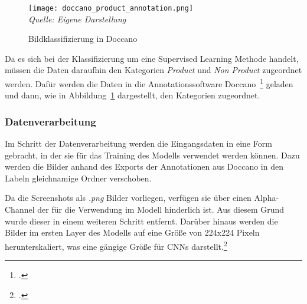 \begin{figure}[H]
    \centering
    \caption[]{Bildklassifizierung in Doccano}
	\label{fig:doccano_products}
    \texttt{[image: doccano\_product\_annotation.png]}
	\\
	\textit{Quelle: Eigene Darstellung}
\end{figure}
Da es sich bei der Klassifizierung um eine Supervised Learning Methode handelt, müssen die Daten daraufhin den Kategorien \textit{Product} und \textit{Non Product} zugeordnet werden.
Dafür werden die Daten in die Annotationssoftware Doccano~\footcite[\vglf][]{doccano-2018} geladen und dann, wie in Abbildung~\ref{fig:doccano_products} dargestellt, den Kategorien zugeordnet.

\subsubsection{Datenverarbeitung}\label{subsubsec_class_datenverarbeitung}
Im Schritt der Datenverarbeitung werden die Eingangsdaten in eine Form gebracht, in der sie für das Training des Modells verwendet werden können.
Dazu werden die Bilder anhand des Exports der Annotationen aus Doccano in den Labeln gleichnamige Ordner verschoben.

Da die Screenshots als \textit{.png} Bilder vorliegen, verfügen sie über einen Alpha-Channel der für die Verwendung im Modell hinderlich ist.
Aus diesem Grund wurde dieser in einem weiteren Schritt entfernt.
Darüber hinaus werden die Bilder im ersten Layer des Modells auf eine Größe von 224x224 Pixeln herunterskaliert, was eine gängige Größe für \aclp{CNN} darstellt.\footcite[\vglf][]{ghosh2019}


